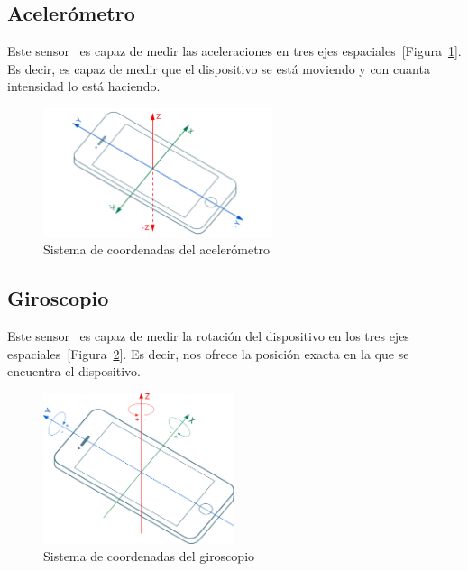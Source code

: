 \subsection{Acelerómetro}
Este sensor~\cite{orientatio_draft} es capaz de medir las aceleraciones en tres ejes espaciales~[Figura~\ref{fig:accelerometer_coordinate_system}]. Es decir, es capaz de medir que el dispositivo se está moviendo y con cuanta intensidad lo está haciendo.

\begin{figure}[h]
    \centering
    \includegraphics[width=0.6\textwidth, keepaspectratio]{imaxes/accelerometer_coordinate_system.png}
    \caption{Sistema de coordenadas del acelerómetro}
    \label{fig:accelerometer_coordinate_system}
\end{figure}


\subsection{Giroscopio}
Este sensor~\cite{gyroscope_draft} es capaz de medir la rotación del dispositivo en los tres ejes espaciales~[Figura~\ref{fig:gyroscope_sensor_coordinate_system}]. Es decir, nos ofrece la posición exacta en la que se encuentra el dispositivo.
\begin{figure}[h]
    \centering
    \includegraphics[width=0.5\textwidth, keepaspectratio]{imaxes/gyroscope_sensor_coordinate_system.png}
    \caption{Sistema de coordenadas del giroscopio}
    \label{fig:gyroscope_sensor_coordinate_system}
\end{figure}

